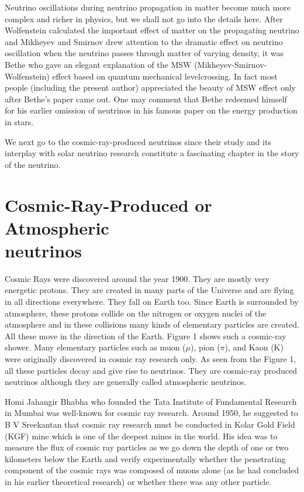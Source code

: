Neutrino oscillations during neutrino propagation in matter become much
more complex and richer in physics, but we shall not go into the details here.
After Wolfenstein calculated the important effect of matter on the propagating neutrino and Mikheyev and Smirnov drew attention to the dramatic
effect on neutrino oscillation when the neutrino passes through matter of varying density, it was Bethe who gave an elegant explanation of the MSW
(Mikheyev-Smirnov-Wolfenstein) effect based on quantum mechanical levelcrossing. In fact most people (including the present author) appreciated the
beauty of MSW effect only after Bethe’s paper came out. One may comment that Bethe redeemed himself for his earlier omission of neutrinos in his
famous paper on the energy production in stars.

We next go to the cosmic-ray-produced neutrinos since their study and
its interplay with solar neutrino research constitute a fascinating chapter in
the story of the neutrino.

\section{Cosmic-Ray-Produced or Atmospheric\\ neutrinos}

Cosmic Rays were discovered around the year 1900. They are mostly very
energetic protons. They are created in many parts of the Universe and are
flying in all directions everywhere. They fall on Earth too. Since Earth is
surrounded by atmosphere, these protons collide on the nitrogen or oxygen
nuclei of the atmosphere and in these collisions many kinds of elementary
particles are created. All these move in the direction of the Earth. Figure 1
shows such a cosmic-ray shower. Many elementary particles such as muon
($\mu$), pion ($\pi$), and Kaon (K) were originally discovered in cosmic ray research
only. As seen from the Figure 1, all these particles decay and give rise
to neutrinos. They are cosmic-ray produced neutrinos although they are
generally called atmospheric neutrinos.

Homi Jahangir Bhabha who founded the Tata Institute of Fundamental
Research in Mumbai was well-known for cosmic ray research. Around 1950,
he suggested to B V Sreekantan that cosmic ray research must be conducted
in Kolar Gold Field (KGF) mine which is one of the deepest mines in the
world. His idea was to measure the flux of cosmic ray particles as we go down
the depth of one or two kilometers below the Earth and verify experimentally whether the penetrating component of the cosmic rays was composed
of muons alone (as he had concluded in his earlier theoretical research) or
whether there was any other particle.


